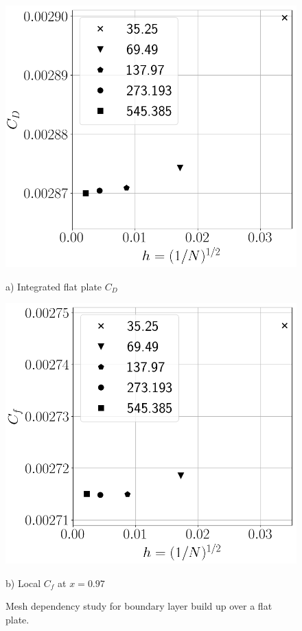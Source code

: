 \begin{figure}[H]
  \centering
  \begin{minipage}{0.45\columnwidth}
  \includegraphics[width=1.\textwidth]{Figures/FPconvstudy.png}
    \caption*{a) Integrated flat plate $C_D$}
  \end{minipage}
  \begin{minipage}{0.45\columnwidth}
  \includegraphics[width=1.\textwidth]{Figures/FPconvstudyCF.png}
    \caption*{b) Local $C_f$ at $x=0.97$}
  \end{minipage}
  \caption{Mesh dependency study for boundary layer build up over a flat plate.} \label{fig:FPconstudy}
\end{figure}
